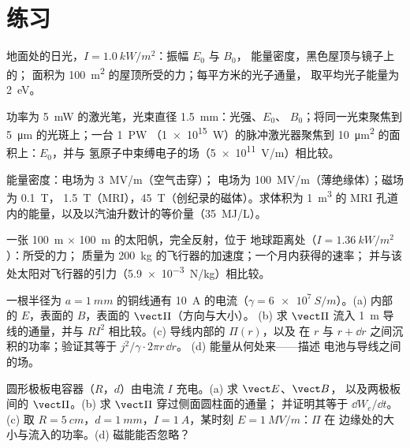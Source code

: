 \section{练习}

\begin{exercise}[$\star$]\label{exo:b2:poynting-vector:1}
地面处的日光，$I = \qty{1.0}{kW/m^2}$：振幅 $E_0$ 与 $B_0$，
能量密度，黑色屋顶与镜子上的；
面积为 \qty{100}{m^2} 的屋顶所受的力；每平方米的光子通量，
取平均光子能量为 \qty{2}{eV}。
\end{exercise}

\begin{exercise}[$\star$]\label{exo:b2:poynting-vector:2}
功率为 \qty{5}{mW} 的激光笔，光束直径 \qty{1.5}{mm}：光强、$E_0$、
$B_0$；将同一光束聚焦到 \qty{5}{\micro m} 的光斑上；一台 \qty{1}{PW}
（\qty{1e15}{W}）的脉冲激光器聚焦到 \qty{10}{\micro m^2} 的面积上：$E_0$，并与
氢原子中束缚电子的场（\qty{5e11}{V/m}）相比较。
\end{exercise}

\begin{exercise}[$\star$]\label{exo:b2:poynting-vector:3}
能量密度：电场为 \qty{3}{MV/m}（空气击穿）；
电场为 \qty{100}{MV/m}（薄绝缘体）；磁场为 \qty{0.1}{T}，
\qty{1.5}{T}（MRI），\qty{45}{T}（创纪录的磁体）。求体积为 \qty{1}{m^3} 的 MRI
孔道内的能量，以及以汽油升数计的等价量（\qty{35}{MJ/L}）。
\end{exercise}

\begin{exercise}[$\star$]\label{exo:b2:poynting-vector:4}
一张 \qty{100}{m} $\times$ \qty{100}{m} 的太阳帆，完全反射，位于
地球距离处（$I = \qty{1.36}{kW/m^2}$）：所受的力；
质量为 \qty{200}{kg} 的飞行器的加速度；一个月内获得的速率；
并与该处太阳对飞行器的引力（\qty{5.9e-3}{N/kg}）相比较。
\end{exercise}

\begin{exercise}[$\star\star$]\label{exo:b2:poynting-vector:5}
一根半径为 $a = \qty{1}{mm}$ 的铜线通有 \qty{10}{A} 的电流（$\gamma =
\qty{6e7}{S/m}$）。(a) 内部的 $E$，表面的 $B$，表面的 $\vect\Pi$（方向与大小）。
(b) 求 $\vect\Pi$ 流入 \qty{1}{m}
导线的通量，并与 $RI^2$ 相比较。(c) 导线内部的 $\Pi(r)$，以及
在 $r$ 与 $r + \dd r$ 之间沉积的功率；验证其等于 $j^2/\gamma\cdot2\pi r\,\dd r$。
(d) 能量从何处来——描述
电池与导线之间的场。
\end{exercise}

\begin{exercise}[$\star\star$]\label{exo:b2:poynting-vector:6}
圆形极板电容器（$R$，$d$）由电流 $I$ 充电。(a) 求 $\vect E$、$\vect B$，
以及两极板间的 $\vect\Pi$。(b) 求 $\vect\Pi$ 穿过侧面圆柱面的通量；
并证明其等于 $\dd W_e/\dd t$。(c) 取 $R = \qty{5}{cm}$，$d =
\qty{1}{mm}$，$I = \qty{1}{A}$，某时刻 $E = \qty{1}{MV/m}$：$\Pi$ 在
边缘处的大小与流入的功率。(d) 磁能能否忽略？
\end{exercise}

